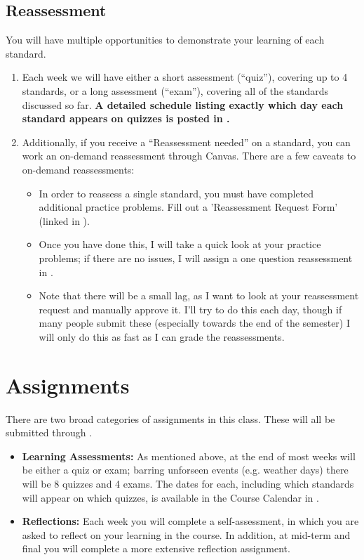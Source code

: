 \documentclass{article}
\begin{document}
    \subsection*{\fontsize{10}{12}\selectfont Reassessment}
    You will have multiple opportunities to demonstrate your learning of each standard.  
    \begin{enumerate}[1)]
    \item Each week we will have either a short assessment (``quiz''), covering  up to 4 standards, or a long assessment (``exam''), covering all of the standards discussed so far.  {\bf A detailed schedule listing exactly which day each standard appears on quizzes is posted in \LMS.}
    \item Additionally, if you receive a ``Reassessment needed'' on a standard, you can work an on-demand reassessment through Canvas.  There are a few caveats to on-demand reassessments:
    \begin{itemize}
    \item In order to reassess a single standard, you must have completed additional practice problems. Fill out a 'Reassessment Request Form' (linked in \LMS).
    \item Once you have done this, I will take a quick look at your practice problems; if there are no issues, I will assign a one question reassessment in \LMS.
    \item Note that there will be a small lag, as I want to look at your reassessment request and manually approve it. I'll try to do this each day, though if many people submit these (especially towards the end of the semester) I will only do this as fast as I can grade the reassessments.
\end{itemize}
    \end{enumerate}



\section*{\fontsize{12}{15}\selectfont Assignments}
There are two broad categories of assignments in this class. These will all be submitted through \LMS.
\begin{itemize}
\item \textbf{Learning Assessments: } As mentioned above, at the end of most weeks will be either a quiz or exam; barring unforseen events (e.g. weather days) there will be 8 quizzes and 4 exams.   The dates for each, including which standards will appear on which quizzes, is available in the Course Calendar in \LMS. 
\item \textbf{Reflections: } Each week you will complete a self-assessment, in which you are asked to reflect on your learning in the course. In addition, at mid-term and final you will complete a more extensive reflection assignment.
\end{itemize}
\end{document}
